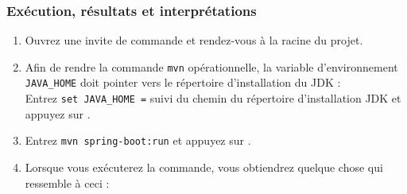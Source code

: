 \subsubsection{Exécution, résultats et interprétations}
\begin{enumerate}
    \item Ouvrez une invite de commande et rendez-vous à la racine du projet.
    \item Afin de rendre la commande \lstinline|mvn| opérationnelle, la variable d'environnement \lstinline|JAVA_HOME| doit pointer vers le répertoire d'installation du JDK  :\\Entrez \lstinline|set JAVA_HOME =| suivi du chemin du répertoire d'installation JDK et appuyez sur \keys{\return}.
    \item Entrez \lstinline|mvn spring-boot:run| et appuyez sur \keys{\return}.
    \item Lorsque vous exécuterez la commande, vous obtiendrez quelque chose qui ressemble à ceci :\\
\end{enumerate}
